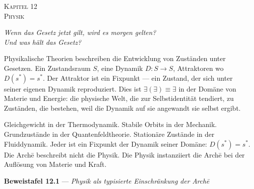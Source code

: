 \documentclass[10pt, openany, oneside]{book}
\renewcommand{\large}{\fontsize{11.5}{14}\selectfont}
\renewcommand{\huge}{\fontsize{17}{21}\selectfont}
\begin{document}
%
%
%
%

\newpage

\begin{center}
    {\huge\scshape Kapitel 12}\\[0.3em]
    {\large\scshape Physik}
\end{center}

\vspace{1.5em}

\begin{center}
    \itshape
    Wenn das Gesetz jetzt gilt, wird es morgen gelten?\\
    Und was hält das Gesetz?
\end{center}

\vspace{2em}


\noindent Physikalische Theorien beschreiben die Entwicklung von Zuständen unter Gesetzen. Ein Zustandsraum $S$, eine Dynamik $D: S \to S$, Attraktoren wo $D(s^*) = s^*$. Der Attraktor ist ein Fixpunkt --- ein Zustand, der sich unter seiner eigenen Dynamik reproduziert. Dies ist $\exists(\exists) \equiv \exists$ in der Domäne von Materie und Energie: die physische Welt, die zur Selbstidentität tendiert, zu Zuständen, die bestehen, weil die Dynamik auf sie angewandt sie selbst ergibt.

Gleichgewicht in der Thermodynamik. Stabile Orbits in der Mechanik. Grundzustände in der Quantenfeldtheorie. Stationäre Zustände in der Fluiddynamik. Jeder ist ein Fixpunkt der Dynamik seiner Domäne: $D(s^*) = s^*$. Die Arch\={e} beschreibt nicht die Physik. Die Physik instanziiert die Arch\={e} bei der Auflösung von Materie und Kraft.

\vspace{0.5em}

\textbf{Beweistafel 12.1} --- \textit{Physik als typisierte Einschränkung der Arch\={e}}

\vspace{0.5em}
\end{document}
